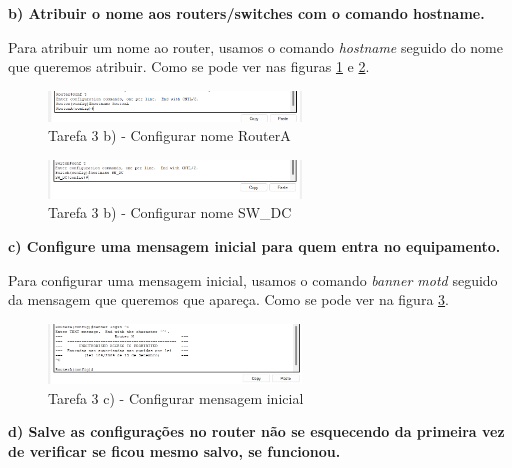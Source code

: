 \documentclass[11pt,english, openright, oneside]{book}
\begin{document}
\textbf{b) Atribuir o nome aos routers/switches com o comando hostname.}
\vspace{0.2cm}

Para atribuir um nome ao router, usamos o comando \textit{hostname} seguido do nome que queremos atribuir. Como se pode ver nas figuras \ref{fig:3b.1} e \ref{fig:3b.2}.
\vspace{0.2cm}

\begin{figure}[H]
    \centering
    \includegraphics[width=0.6\textwidth]{imagens/Tarefa3/3.b.1.png}
    \caption{Tarefa 3 b) - Configurar nome RouterA}
    \label{fig:3b.1}
\end{figure}

\begin{figure}[H]
    \centering
    \includegraphics[width=0.6\textwidth]{imagens/Tarefa3/3.b.2.png}
    \caption{Tarefa 3 b) - Configurar nome SW\_DC}
    \label{fig:3b.2}
\end{figure}

\vspace{0.8cm}

\textbf{c) Configure uma mensagem inicial para quem entra no equipamento.}
\vspace{0.2cm}

Para configurar uma mensagem inicial, usamos o comando \textit{banner motd} seguido da mensagem que queremos que apareça. Como se pode ver na figura \ref{fig:3c}.
\vspace{0.2cm}

\begin{figure}[H]
    \centering
    \includegraphics[width=0.6\textwidth]{imagens/Tarefa3/3.c.png}
    \caption{Tarefa 3 c) - Configurar mensagem inicial}
    \label{fig:3c}
\end{figure}

\vspace{0.8cm}

\textbf{d)	Salve as configurações no router não se esquecendo da primeira vez de verificar se ficou mesmo salvo, se funcionou.}
\vspace{0.2cm}
\end{document}
